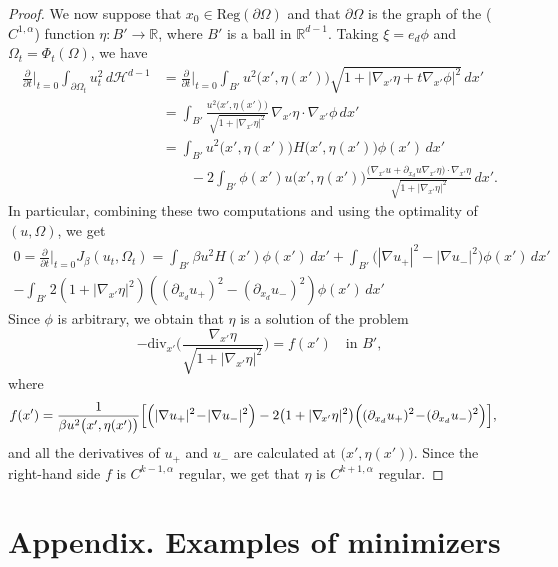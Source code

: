 \documentclass[11pt]{article}
\numberwithin{equation}{section}
\theoremstyle{plain}
\theoremstyle{definition}
\def\R{\mathbb{R}}
\def\HH{\mathcal{H}}
\begin{document}
\begin{proof}
We now suppose that $x_0\in \text{Reg}(\partial\Omega)$ and that $\partial \Omega$ is the graph of the ($C^{1,\alpha}$) function $\eta:B'\to\R$, where $B'$ is a ball in $\R^{d-1}$.
Taking $\xi=e_d\phi$ and $\Omega_t=\Phi_t(\Omega)$, we have
\begin{align*}
\frac{\partial}{\partial t}\Big\vert_{t=0}\int_{\partial\Omega_t}u_t^2\,d\HH^{d-1}&=\frac{\partial}{\partial t}\Big\vert_{t=0}\int_{B'}u^2\big(x',\eta(x')\big)\sqrt{1+|\nabla_{\!x'}\eta+t\nabla_{\!x'}\phi|^2}\,dx'\\
&=\int_{B'}\frac{u^2\big(x',\eta(x')\big)}{\sqrt{1+|\nabla_{\!x'}\eta|^2}}\,\nabla_{\!x'}\eta\cdot\nabla_{\!x'}\phi\,dx'\\
&=\int_{B'}u^2\big(x',\eta(x')\big)H\big(x',\eta(x')\big)\phi(x')\,dx'\\
&\qquad -2\int_{B'}\phi(x')u\big(x',\eta(x')\big)\frac{\big(\nabla_{\!x'}u+\partial_{x_d}u\nabla_{\!x'}\eta\big)\cdot\nabla_{\!x'}\eta}{\sqrt{1+|\nabla_{\!x'}\eta|^2}}\,dx'.
\end{align*}
In particular, combining these two computations and using the optimality of $(u,\Omega)$, we get
\begin{multline*}
0=\frac{\partial}{\partial t}\Big\vert_{t=0}J_\beta(u_t,\Omega_t)=\int_{B'}\beta u^2 H(x')\phi(x')\,dx'+\int_{B'}\big(|\nabla u_+|^2-|\nabla u_-|^2\big)\phi(x')\,dx'\\
-\int_{B'}2\left(1+|\nabla_{\!x'}\eta|^2\right)\left((\partial_{x_d} u_+)^2-(\partial_{x_d}u_-)^2\right)\phi(x')\,dx'
\end{multline*}
Since $\phi$ is arbitrary, we obtain that $\eta$ is a solution of the problem
\[-\text{div}_{x'}\biggl(\frac{\nabla_{\!x'}\eta}{\sqrt{1+|\nabla_{\!x'}\eta|^2}}\biggr)=f(x')\quad\text{in } B',\]
where
\begin{align*}
f(x')&=\frac1{\beta u^2\big(x',\eta(x')\big)}\Bigl[\Bigl(|\nabla u_+|^2\!-\!|\nabla u_-|^2\Bigr)-2\big(1+|\nabla_{\!x'}\eta|^2\big)\Bigl((\partial_{x_d} u_+)^2\!-\!(\partial_{x_d}u_-)^2\Bigr)\Bigr],
\end{align*}
and all the derivatives of $u_+$ and $u_-$ are calculated at $\big(x',\eta(x')\big)$. Since the right-hand side $f$ is $C^{k-1,\alpha}$ regular, we get that $\eta$ is $C^{k+1,\alpha}$ regular.
\end{proof}

\appendix

\section*{Appendix. Examples of minimizers}
\end{document}
